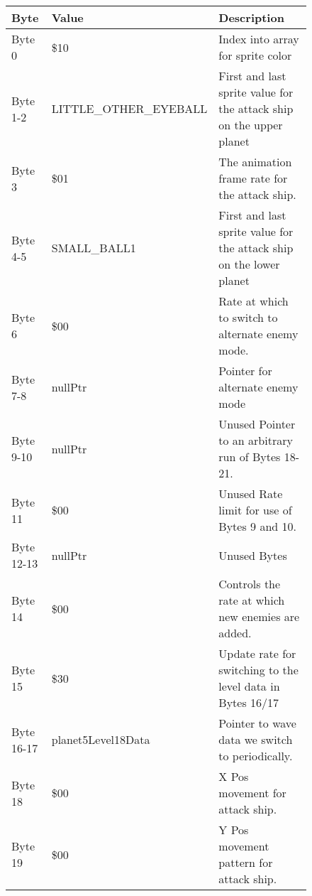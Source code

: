 \begin{figure}[H]
  {
  \setlength{\tabcolsep}{3.0pt}
  \setlength\cmidrulewidth{\heavyrulewidth} %
  \begin{adjustbox}{width=12cm}

\begin{tabular}{lll}
\toprule
 Byte       & Value                     & Description                                                         \\
\midrule
 Byte 0     & \$10                       & Index into array for sprite color                                   \\
 Byte 1-2   & LITTLE\_OTHER\_EYEBALL      & First and last sprite value for the attack ship on the upper planet \\
 Byte 3     & \$01                       & The animation frame rate for the attack ship.                       \\
 Byte 4-5   & SMALL\_BALL1               & First and last sprite value for the attack ship on the lower planet \\
 Byte 6     & \$00                       & Rate at which to switch to alternate enemy mode.                    \\
 Byte 7-8   & nullPtr                   & Pointer for alternate enemy mode                                    \\
 Byte 9-10  & nullPtr                   & Unused Pointer to an arbitrary run of Bytes 18-21.                  \\
 Byte 11    & \$00                       & Unused Rate limit for use of Bytes 9 and 10.                        \\
 Byte 12-13 & nullPtr                   & Unused Bytes                                                        \\
 Byte 14    & \$00                       & Controls the rate at which new enemies are added.                   \\
 Byte 15    & \$30                       & Update rate for switching to the level data in Bytes 16/17          \\
 Byte 16-17 & planet5Level18Data        & Pointer to wave data we switch to periodically.                     \\
 Byte 18    & \$00                       & X Pos movement for attack ship.                                     \\
 Byte 19    & \$00                       & Y Pos movement pattern for attack ship.                             \\

\end{tabular}
\end{adjustbox}}
\end{figure}
